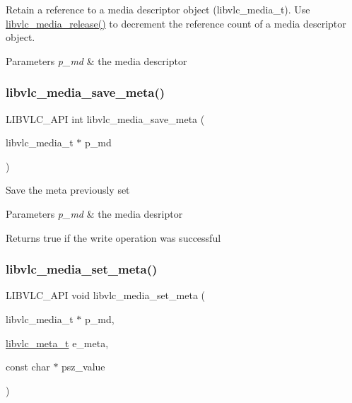 Retain a reference to a media descriptor object (libvlc\+\_\+media\+\_\+t). Use \hyperlink{group__libvlc__media_gaffccede262624a361e20c3e887fa9b42}{libvlc\+\_\+media\+\_\+release()} to decrement the reference count of a media descriptor object.


\begin{DoxyParams}{Parameters}
{\em p\+\_\+md} & the media descriptor \\
\hline
\end{DoxyParams}
\mbox{\label{group__libvlc__media_ga7b5c8c9206b71627a1a600e165d3c1e5}} 
\subsubsection{\texorpdfstring{libvlc\+\_\+media\+\_\+save\+\_\+meta()}{libvlc\_media\_save\_meta()}}
{\footnotesize\ttfamily L\+I\+B\+V\+L\+C\+\_\+\+A\+PI int libvlc\+\_\+media\+\_\+save\+\_\+meta (\begin{DoxyParamCaption}\item[{libvlc\+\_\+media\+\_\+t $\ast$}]{p\+\_\+md }\end{DoxyParamCaption})}

Save the meta previously set


\begin{DoxyParams}{Parameters}
{\em p\+\_\+md} & the media desriptor \\
\hline
\end{DoxyParams}
\begin{DoxyReturn}{Returns}
true if the write operation was successful 
\end{DoxyReturn}
\mbox{\label{group__libvlc__media_gae116bf2e93c0e51aa5824f6e69aeaa64}} 
\subsubsection{\texorpdfstring{libvlc\+\_\+media\+\_\+set\+\_\+meta()}{libvlc\_media\_set\_meta()}}
{\footnotesize\ttfamily L\+I\+B\+V\+L\+C\+\_\+\+A\+PI void libvlc\+\_\+media\+\_\+set\+\_\+meta (\begin{DoxyParamCaption}\item[{libvlc\+\_\+media\+\_\+t $\ast$}]{p\+\_\+md,  }\item[{\hyperlink{group__libvlc__media_ga90e7814a020f87d4c443d8d09b6dd4a0}{libvlc\+\_\+meta\+\_\+t}}]{e\+\_\+meta,  }\item[{const char $\ast$}]{psz\+\_\+value }\end{DoxyParamCaption})}

